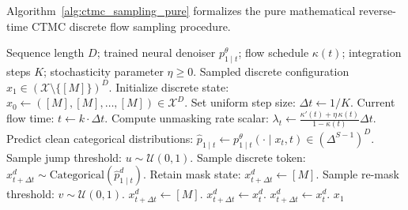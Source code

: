 Algorithm~\ref{alg:ctmc_sampling_pure} formalizes the pure mathematical reverse-time CTMC discrete flow sampling procedure.

\begin{algorithm}[!ht]
\caption{Reverse-Time CTMC Discrete Flow Sampling (Euler Method)}
\label{alg:ctmc_sampling_pure}
\begin{algorithmic}[1]
\Require Sequence length $D$; trained neural denoiser $p_{1 \mid t}^\theta$; flow schedule $\kappa(t)$; integration steps $K$; stochasticity parameter $\eta \ge 0$.
\Ensure Sampled discrete configuration $x_1 \in (\mathcal{X} \setminus \{[M]\})^D$.
\State Initialize discrete state: $x_0 \gets ([M], [M], \dots, [M]) \in \mathcal{X}^D$.
\State Set uniform step size: $\Delta t \gets 1 / K$.
    \State Current flow time: $t \gets k \cdot \Delta t$.
    \State Compute unmasking rate scalar: $\lambda_t \gets \frac{\kappa'(t) + \eta \, \kappa(t)}{1 - \kappa(t)} \Delta t$.
    \State Predict clean categorical distributions: $\hat{p}_{1 \mid t} \gets p_{1 \mid t}^\theta(\cdot \mid x_t, t) \in (\Delta^{S-1})^D$.
            \State Sample jump threshold: $u \sim \mathcal{U}(0, 1)$.
             
                \State Sample discrete token: $x_{t+\Delta t}^d \sim \text{Categorical}(\hat{p}_{1 \mid t}^d)$.
            \Else
                \State Retain mask state: $x_{t+\Delta t}^d \gets [M]$.
            \EndIf
        \Else {}
             
                \State Sample re-mask threshold: $v \sim \mathcal{U}(0, 1)$.
                    \State $x_{t+\Delta t}^d \gets [M]$.
                \Else
                    \State $x_{t+\Delta t}^d \gets x_t^d$.
                \EndIf
            \Else
                \State $x_{t+\Delta t}^d \gets x_t^d$. 
            \EndIf
        \EndIf
    \EndFor
\EndFor
\State \Return $x_1$
\end{algorithmic}
\end{algorithm}
